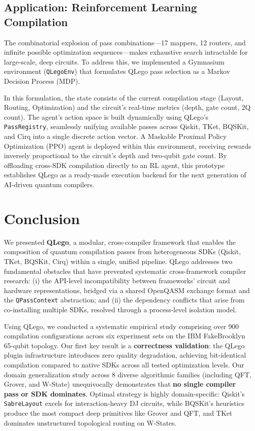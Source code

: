 \documentclass[conference]{IEEEtran}
\begin{document}
\subsection{Application: Reinforcement Learning Compilation}

The combinatorial explosion of pass combinations—17 mappers, 12 routers, and infinite possible optimization sequences—makes exhaustive search intractable for large-scale, deep circuits. To address this, we implemented a Gymnasium environment (\texttt{QLegoEnv}) that formulates QLego pass selection as a Markov Decision Process (MDP).

In this formulation, the state consists of the current compilation stage (Layout, Routing, Optimization) and the circuit's real-time metrics (depth, gate count, 2Q count). The agent's action space is built dynamically using QLego's \texttt{PassRegistry}, seamlessly unifying available passes across Qiskit, TKet, BQSKit, and Cirq into a single discrete action vector. A Maskable Proximal Policy Optimization (PPO) agent is deployed within this environment, receiving rewards inversely proportional to the circuit's depth and two-qubit gate count. By offloading cross-SDK compilation directly to an RL agent, this prototype establishes QLego as a ready-made execution backend for the next generation of AI-driven quantum compilers.

\section{Conclusion}
\label{sec:conclusion}

We presented \textbf{QLego}, a modular, cross-compiler framework that enables the composition of quantum compilation passes from heterogeneous SDKs (Qiskit, TKet, BQSKit, Cirq) within a single, unified pipeline. QLego addresses two fundamental obstacles that have prevented systematic cross-framework compiler research: (i) the API-level incompatibility between frameworks' circuit and hardware representations, bridged via a shared OpenQASM exchange format and the \texttt{QPassContext} abstraction; and (ii) the dependency conflicts that arise from co-installing multiple SDKs, resolved through a process-level isolation model.

Using QLego, we conducted a systematic empirical study comprising over 900 compilation configurations across six experiment sets on the IBM FakeBrooklyn 65-qubit topology. Our first key result is a \textbf{correctness validation}: the QLego plugin infrastructure introduces zero quality degradation, achieving bit-identical compilation compared to native SDKs across all tested optimization levels. Our domain generalization study across 8 diverse algorithmic families (including QFT, Grover, and W-State) unequivocally demonstrates that \textbf{no single compiler pass or SDK dominates}. Optimal strategy is highly domain-specific: Qiskit's \texttt{SabreLayout} excels for interaction-heavy DJ circuits, while BQSKit's heuristics produce the most compact deep primitives like Grover and QFT, and TKet dominates unstructured topological routing on W-States.
\end{document}
